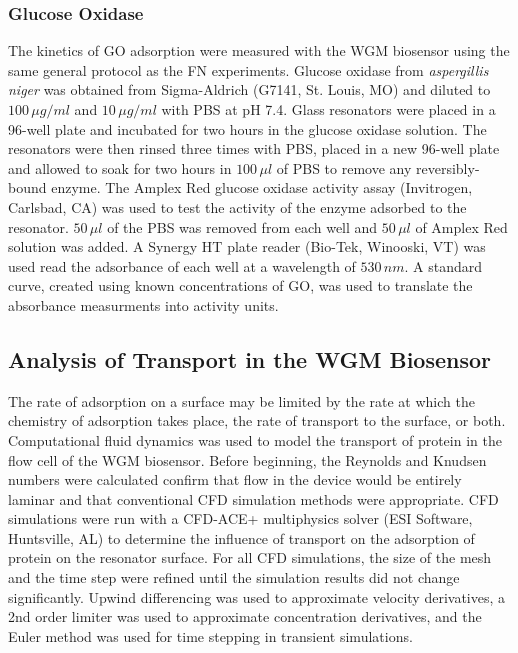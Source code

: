 \subsubsection{Glucose Oxidase}

The kinetics of GO adsorption were measured with the WGM biosensor
using the same general protocol as the FN experiments. Glucose oxidase
from \emph{aspergillis niger} was obtained from Sigma-Aldrich (G7141,
St. Louis, MO) and diluted to $100\,\mu g/ml$ and $10\,\mu g/ml$
with PBS at pH 7.4. Glass resonators were placed in a 96-well plate
and incubated for two hours in the glucose oxidase solution. The resonators
were then rinsed three times with PBS, placed in a new 96-well plate
and allowed to soak for two hours in $100\,\mu l$ of PBS to remove
any reversibly-bound enzyme. The Amplex Red glucose oxidase activity
assay (Invitrogen, Carlsbad, CA) was used to test the activity of
the enzyme adsorbed to the resonator. $50\,\mu l$ of the PBS was
removed from each well and $50\,\mu l$ of Amplex Red solution was
added. A Synergy HT plate reader (Bio-Tek, Winooski, VT) was used
read the adsorbance of each well at a wavelength of $530\, nm$. A
standard curve, created using known concentrations of GO, was used
to translate the absorbance measurments into activity units.


\subsection{Analysis of Transport in the WGM Biosensor}

The rate of adsorption on a surface may be limited by the rate at
which the chemistry of adsorption takes place, the rate of transport
to the surface, or both. Computational fluid dynamics was used to
model the transport of protein in the flow cell of the WGM biosensor.
Before beginning, the Reynolds and Knudsen numbers were calculated
confirm that flow in the device would be entirely laminar and that
conventional CFD simulation methods were appropriate. CFD simulations
were run with a CFD-ACE+ multiphysics solver (ESI Software, Huntsville,
AL) to determine the influence of transport on the adsorption of protein
on the resonator surface. For all CFD simulations, the size of the
mesh and the time step were refined until the simulation results did
not change significantly. Upwind differencing was used to approximate
velocity derivatives, a 2nd order limiter was used to approximate
concentration derivatives, and the Euler method was used for time
stepping in transient simulations. 

